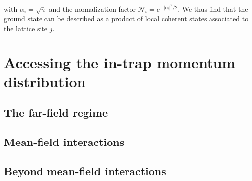 \noindent with $\alpha_i=\sqrt{\bar{n}}$ and the normalization factor $\mathcal{N}_{i}=e^{-\left|\alpha_{i}\right|^{2} / 2}$. We thus find that the ground state can be described as a product of local coherent states associated to the lattice site $j$.

\section{Accessing the in-trap momentum distribution}

\subsection{The far-field regime}

\subsection{Mean-field interactions}

\subsection{Beyond mean-field interactions}

